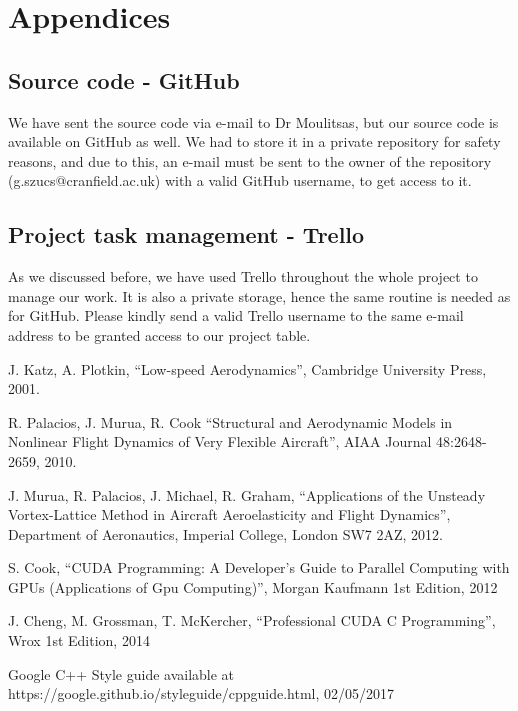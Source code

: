 \documentclass[a4paper, 11pt, article]{report}
\begin{document}
\chapter{Appendices}

\section{Source code - GitHub}

We have sent the source code via e-mail to Dr Moulitsas, but our source code is available on GitHub as well. We had to store it in a private repository for safety reasons, and due to this, an e-mail must be sent to the owner of the repository (g.szucs@cranfield.ac.uk) with a valid GitHub username, to get access to it. 

\section{Project task management - Trello}

As we discussed before, we have used Trello throughout the whole project to manage our work. It is also a private storage, hence the same routine is needed as for GitHub. Please kindly send a valid Trello username to the same e-mail address to be granted access to our project table. 


\begingroup
\renewcommand{\section}[2]{}%
\begin{thebibliography}{1}

 J. Katz, A. Plotkin, “Low-speed Aerodynamics”, Cambridge University Press, 2001.

 R. Palacios, J. Murua, R. Cook “Structural and Aerodynamic Models in Nonlinear Flight Dynamics of Very Flexible Aircraft”, AIAA Journal 48:2648-2659, 2010.

 J. Murua, R. Palacios, J. Michael, R. Graham, “Applications of the Unsteady Vortex-Lattice Method in Aircraft Aeroelasticity and Flight Dynamics”, Department of Aeronautics, Imperial College, London SW7 2AZ, 2012.

 S. Cook, “CUDA Programming: A Developer's Guide to Parallel Computing with GPUs (Applications of Gpu Computing)”, Morgan Kaufmann 1st Edition, 2012

 J. Cheng, M. Grossman, T. McKercher, “Professional CUDA C Programming”, Wrox 1st Edition, 2014

 Google C++ Style guide available at https://google.github.io/styleguide/cppguide.html, 02/05/2017

\end{thebibliography}
\endgroup
   
\end{document}
